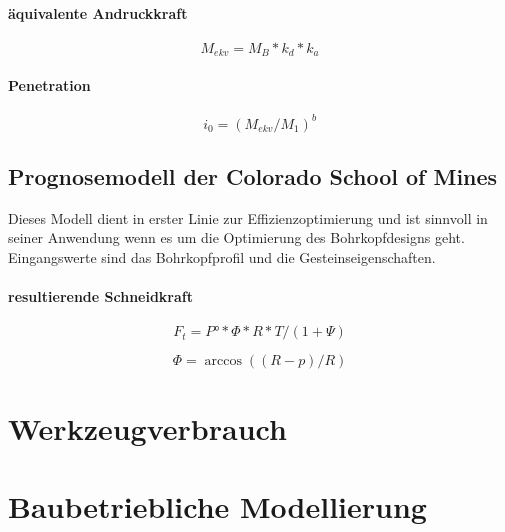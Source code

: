 \paragraph{äquivalente Andruckkraft}
\begin{equation}
\label{eg:andruckkraft}
M_{ekv}=M_{B}*k_{d}*k_{a}
\end{equation}

\paragraph{Penetration}
\begin{equation}
\label{eg:penetration}
i_{0}=(M_{ekv}/M_{1})^{b}
\end{equation}

\subsection{Prognosemodell der Colorado School of Mines}
\label{prognose_csm}
Dieses Modell dient in erster Linie zur Effizienzoptimierung und ist sinnvoll in seiner Anwendung wenn es um die Optimierung des Bohrkopfdesigns geht. Eingangswerte sind das Bohrkopfprofil und die Gesteinseigenschaften.
\paragraph{resultierende Schneidkraft}
\begin{equation}
F_{t}=P°*\Phi*R*T/(1+\Psi)
\end{equation}

\begin{equation}
\Phi=\arccos((R-p)/R)
\end{equation}

\section{Werkzeugverbrauch}
\label{werkzeugverbrauch}


\section{Baubetriebliche Modellierung}
\label{baubetr_modell}
